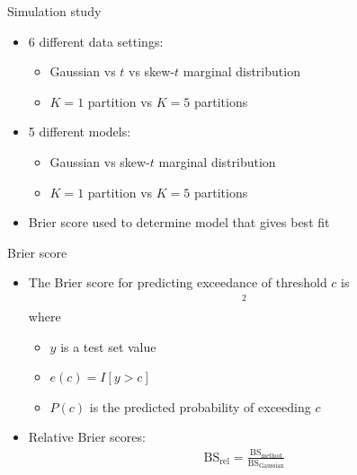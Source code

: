 \documentclass{beamer}
\begin{document}
\begin{frame}{Simulation study}
  \begin{itemize} \setlength{\itemsep}{0.5em}
    \item 6 different data settings:
    \begin{itemize}
      \item Gaussian vs $t$ vs skew-$t$ marginal distribution
        \item $K=1$ partition vs $K=5$ partitions
    \end{itemize}
    \item 5 different models:
    \begin{itemize}
      \item Gaussian vs skew-$t$ marginal distribution
      \item $K = 1$ partition vs $K = 5$ partitions
    \end{itemize}
    \item Brier score used to determine model that gives best fit
  \end{itemize}
\end{frame}


\begin{frame}{Brier score}
  \begin{itemize} \setlength{\itemsep}{0.5em}
  \item The Brier score for predicting exceedance of threshold $c$ is
  \begin{align*}
    [e(c) - P(c)]^2
  \end{align*}
  where
  \begin{itemize}
    \item $y$ is a test set value
    \item $e(c) = I[y > c]$
    \item $P(c)$ is the predicted probability of exceeding $c$
  \end{itemize}
  \item Relative Brier scores:
  \begin{align*}
    \text{BS}_\text{rel} = \frac{ \text{BS}_\text{method}}{ \text{BS}_\text{Gaussian}}
  \end{align*}
  \end{itemize}
\end{frame}
\end{document}
